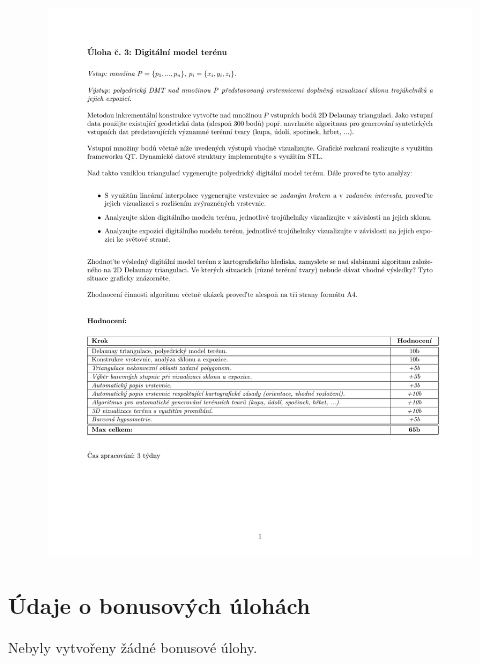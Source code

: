 \documentclass[a4paper, 12pt]{article}
\begin{document}
\begin{figure}[h!]
	\centering
	\includegraphics[width=17cm]{zadani.pdf}
\end{figure}

\subsection{Údaje o bonusových úlohách}
Nebyly vytvořeny žádné bonusové úlohy.
\end{document}
